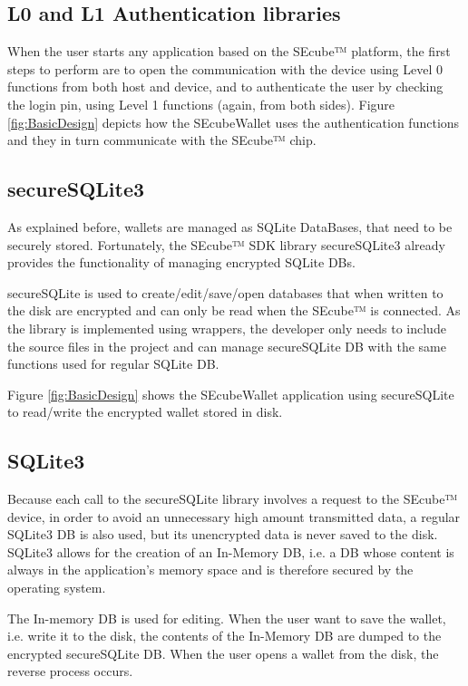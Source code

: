 \subsection{L0 and L1 Authentication libraries}

When the user starts any application based on the SEcube™ platform, the first steps to perform are to open the communication with the device using Level 0 functions from both host and device, and to authenticate the user by checking the login pin, using Level 1 functions (again, from both sides). Figure \ref{fig:BasicDesign} depicts how the SEcubeWallet uses the authentication functions and they in turn communicate with the SEcube™ chip.

\subsection{secureSQLite3}
As explained before, wallets are managed as SQLite DataBases, that need to be securely stored. Fortunately, the SEcube™ SDK library secureSQLite3 already provides the functionality of managing encrypted SQLite DBs.

secureSQLite is used to create/edit/save/open databases that when written to the disk are encrypted and can only be read when the SEcube™ is connected. As the library is implemented using wrappers, the developer only needs to include the source files in the project and can manage secureSQLite DB with the same functions used for regular SQLite DB.

Figure \ref{fig:BasicDesign} shows the SEcubeWallet application using secureSQLite to read/write the encrypted wallet stored in disk.

\subsection{SQLite3}
Because each call to the secureSQLite library involves a request to the SEcube™ device, in order to avoid an unnecessary high amount transmitted data, a regular SQLite3 DB is also used, but its unencrypted data is never saved to the disk. SQLite3 allows for the creation of an In-Memory DB, i.e. a DB whose content is always in the application's memory space and is therefore secured by the operating system. 

The In-memory DB is used for editing. When the user want to save the wallet, i.e. write it to the disk, the contents of the In-Memory DB are dumped to the encrypted secureSQLite DB. When the user opens a wallet from the disk, the reverse process occurs.

